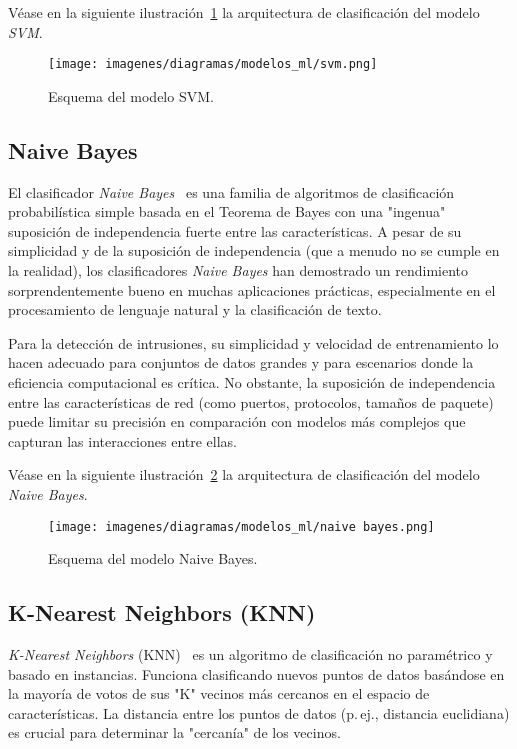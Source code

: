Véase en la siguiente ilustración~\ref{Fig.SVM} la arquitectura de clasificación del modelo \textit{SVM}.

\begin{figure}[ht!]
  \centering
  \texttt{[image: imagenes/diagramas/modelos\_ml/svm.png]}
  \caption{Esquema del modelo SVM.}
  \label{Fig.SVM}
\end{figure}

\subsection{Naive Bayes}
El clasificador \textit{Naive Bayes}~\cite{ibmNaiveBayes} es una familia de algoritmos de clasificación probabilística simple basada en el Teorema de Bayes con una "ingenua" suposición de independencia fuerte entre las características. A pesar de su simplicidad y de la suposición de independencia (que a menudo no se cumple en la realidad), los clasificadores \textit{Naive Bayes} han demostrado un rendimiento sorprendentemente bueno en muchas aplicaciones prácticas, especialmente en el procesamiento de lenguaje natural y la clasificación de texto.

Para la detección de intrusiones, su simplicidad y velocidad de entrenamiento lo hacen adecuado para conjuntos de datos grandes y para escenarios donde la eficiencia computacional es crítica. No obstante, la suposición de independencia entre las características de red (como puertos, protocolos, tamaños de paquete) puede limitar su precisión en comparación con modelos más complejos que capturan las interacciones entre ellas.

Véase en la siguiente ilustración~\ref{Fig.nb} la arquitectura de clasificación del modelo \textit{Naive Bayes}.

\begin{figure}[ht!]
  \centering
  \texttt{[image: imagenes/diagramas/modelos\_ml/naive bayes.png]}
  \caption{Esquema del modelo Naive Bayes.}
  \label{Fig.nb}
\end{figure}

\subsection{K-Nearest Neighbors (KNN)}
\textit{K-Nearest Neighbors} (KNN)~\cite{ibmKNN} es un algoritmo de clasificación no paramétrico y basado en instancias. Funciona clasificando nuevos puntos de datos basándose en la mayoría de votos de sus "K" vecinos más cercanos en el espacio de características. La distancia entre los puntos de datos (p.\,ej., distancia euclidiana) es crucial para determinar la "cercanía" de los vecinos.

